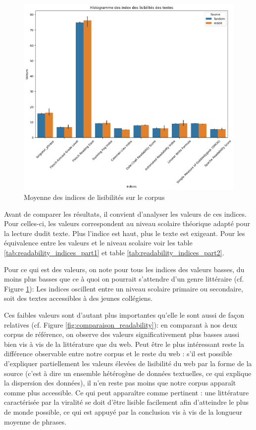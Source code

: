 \documentclass[12pt,a4paper,oneside,titlepage]{book} %
\begin{document}
	\begin{figure}
\centering
\includegraphics[scale=0.45]{illustration/comparaison_lisibilite_source.png}
\caption{Moyenne des indices de lisibilités sur le corpus}
\label{fig:mean_readbility}
	\end{figure}
	
	Avant de comparer les résultats, il convient d'analyser les valeurs de ces indices. Pour celles-ci, les valeurs correspondent au niveau scolaire théorique adapté pour la lecture dudit texte. Plus l'indice est haut, plus le texte est exigeant. Pour les équivalence entre les valeurs et le niveau scolaire voir les table \ref{tab:readability_indices_part1} et table \ref{tab:readability_indices_part2}.
	

	Pour ce qui est des valeurs, on note pour tous les indices des valeurs basses, du moins plus basses que ce à quoi on pourrait s'attendre d'un genre littéraire (cf. Figure \ref{fig:mean_readbility}): Les indices oscillent entre un niveau scolaire primaire ou secondaire, soit des textes accessibles à des jeunes collégiens. 
	
	
	Ces faibles valeurs sont d'autant plus importantes qu'elle le sont aussi de façon relatives (cf. Figure \ref{fig:comparaison_readability}): en comparant à nos deux corpus de référence, on observe des valeurs significativement plus basses aussi bien vis à vis de la littérature que du web. 
	Peut être le plus intéressant reste la différence observable entre notre corpus et le reste du web : s'il est possible d'expliquer partiellement les valeurs élevées de lisibilité du web par la forme de la source (c'est à dire un ensemble hétérogène de données textuelles, ce qui explique la dispersion des données), il n'en reste pas moins que notre corpus apparaît comme plus accessible. Ce qui peut  apparaître comme pertinent : une littérature caractérisée par la viralité se doit d'être lisible facilement afin d'atteindre le plus de monde possible, ce qui est appuyé par la conclusion vis à vis de la longueur moyenne de phrases.
	
\end{document}

